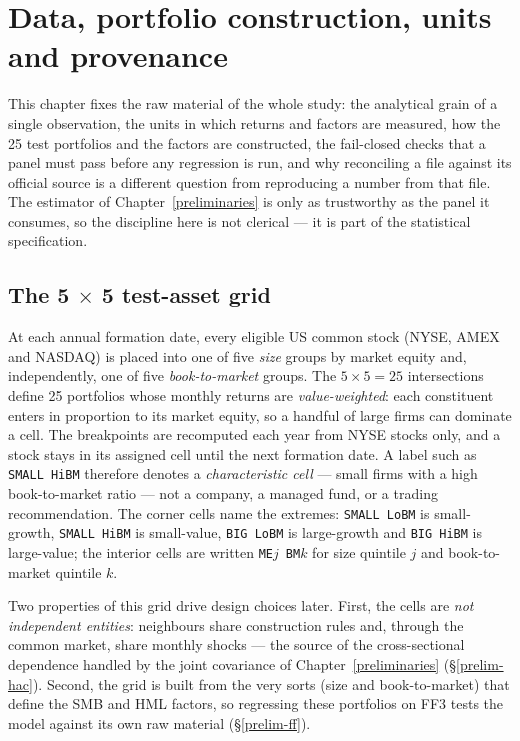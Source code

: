 \hypertarget{data}{}
\hypertarget{data-portfolio-construction-units-and-provenance}{%
\chapter{Data, portfolio construction, units and
provenance}\label{data-portfolio-construction-units-and-provenance}}

This chapter fixes the raw material of the whole study: the analytical
grain of a single observation, the units in which returns and factors are
measured, how the 25 test portfolios and the factors are constructed, the
fail-closed checks that a panel must pass before any regression is run,
and why reconciling a file against its official source is a different
question from reproducing a number from that file. The estimator of
Chapter~\ref{preliminaries} is only as trustworthy as the panel it
consumes, so the discipline here is not clerical --- it is part of the
statistical specification.

\hypertarget{the-5-5-test-asset-grid}{%
\section{The 5 \ensuremath{\times } 5 test-asset grid}\label{the-5-5-test-asset-grid}}

At each annual formation date, every eligible US common stock
(NYSE, AMEX and NASDAQ) is placed into one of five \emph{size} groups by
market equity and, independently, one of five \emph{book-to-market}
groups. The $5\times5=25$ intersections define 25 portfolios whose monthly
returns are \emph{value-weighted}: each constituent enters in proportion
to its market equity, so a handful of large firms can dominate a cell. The
breakpoints are recomputed each year from NYSE stocks only, and a stock
stays in its assigned cell until the next formation date. A label such as
\texttt{SMALL\ HiBM} therefore denotes a \emph{characteristic cell} ---
small firms with a high book-to-market ratio --- not a company, a managed
fund, or a trading recommendation. The corner cells name the extremes:
\texttt{SMALL\ LoBM} is small-growth, \texttt{SMALL\ HiBM} is small-value,
\texttt{BIG\ LoBM} is large-growth and \texttt{BIG\ HiBM} is large-value;
the interior cells are written \texttt{ME}$j$~\texttt{BM}$k$ for size
quintile $j$ and book-to-market quintile $k$.

Two properties of this grid drive design choices later. First, the cells
are \emph{not independent entities}: neighbours share construction rules
and, through the common market, share monthly shocks --- the source of the
cross-sectional dependence handled by the joint covariance of
Chapter~\ref{preliminaries} (\S\ref{prelim-hac}). Second, the grid is
built from the very sorts (size and book-to-market) that define the SMB
and HML factors, so regressing these portfolios on FF3 tests the model
against its own raw material (\S\ref{prelim-ff}).

